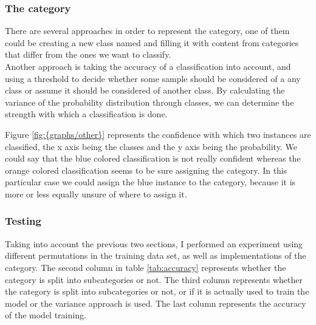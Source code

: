
 

\subsubsection{The  category}
There are several approaches in order to represent the  category, one of them could be creating a new class named  and filling it with content from categories that 
differ from the ones we want to classify.\\
Another approach is taking the accuracy of a classification into account, and using a threshold to decide whether some sample should be considered of a any class or assume it should be considered of 
another class. 
By calculating the variance of the probability distribution through classes, we can determine the strength with which a classification is done.   


Figure \ref{fig:{graphs/other}} represents the confidence with which two instances are classified, the x axis being the classes
and the y axis being the probability. We could say that the blue colored classification is not really confident whereas the orange colored classification seems to be sure assigning the  
category. In this particular case we could assign the blue instance to the  category, because it is more or less equally unsure of where to assign it.


\subsubsection{Testing}
Taking into account the previous two sections, I performed an experiment using different permutations in the training data set, as well as implementations of the  category. 
The second column in table \ref{tab:accuracy} represents whether the  category is split into subcategories or not. The third column represents whether the  category
is split into subcategories or not, or if it is actually used to train the model or the variance approach is used. The last column represents the accuracy of the model training. \\
 
